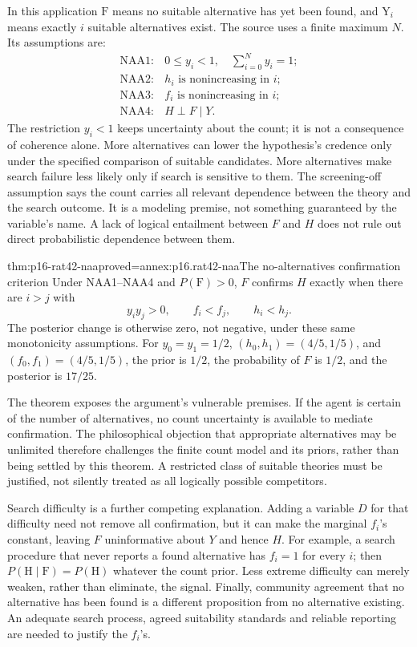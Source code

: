 In this application \(\mathrm F\) means no suitable alternative has yet
been found, and \(\mathrm Y_i\) means exactly \(i\) suitable alternatives
exist. The source uses a finite maximum \(N\). Its assumptions are:
\[
\begin{array}{ll}
 \mathrm{NAA1}:&0\leq y_i<1,\quad \sum_{i=0}^N y_i=1;\\
 \mathrm{NAA2}:&h_i\text{ is nonincreasing in }i;\\
 \mathrm{NAA3}:&f_i\text{ is nonincreasing in }i;\\
 \mathrm{NAA4}:&H\perp F\mid Y.
\end{array}
\]
The restriction \(y_i<1\) keeps uncertainty about the count;
it is not a consequence of coherence alone. More alternatives can
lower the hypothesis's credence only under the specified comparison of
suitable candidates. More alternatives make search failure less likely
only if search is sensitive to them. The screening-off assumption says
the count carries all relevant dependence between the theory and the
search outcome. It is a modeling premise, not something guaranteed by
the variable's name. A lack of logical entailment between \(F\) and
\(H\) does not rule out direct probabilistic dependence between them.

\begin{hbtheorem}{thm:p16-rat42-naa}{proved=annex:p16.rat42-naa}{The no-alternatives confirmation criterion}
Under NAA1--NAA4 and \(P(\mathrm F)>0\), \(F\) confirms \(H\)
exactly when there are \(i>j\) with
\[
           y_i y_j>0,\qquad f_i<f_j,
                          \qquad h_i<h_j.
\]
The posterior change is otherwise zero, not negative, under these
same monotonicity assumptions.
For \(y_0=y_1=1/2\),
\((h_0,h_1)=(4/5,1/5)\), and
\((f_0,f_1)=(4/5,1/5)\), the prior is \(1/2\),
the probability of \(F\) is \(1/2\), and the posterior is \(17/25\).
\end{hbtheorem}

The theorem exposes the argument's vulnerable premises. If the agent is
certain of the number of alternatives, no count uncertainty is available
to mediate confirmation. The philosophical objection that appropriate
alternatives may be unlimited therefore challenges the finite count model
and its priors, rather than being settled by this theorem. A restricted
class of suitable theories must be justified, not silently treated as
all logically possible competitors.

Search difficulty is a further competing explanation. Adding a variable
\(D\) for that difficulty need not remove all confirmation, but it can
make the marginal \(f_i\)'s constant, leaving \(F\) uninformative about
\(Y\) and hence \(H\). For example, a search procedure that never
reports a found alternative has \(f_i=1\) for every \(i\); then
\(P(\mathrm H\mid\mathrm F)=P(\mathrm H)\) whatever the count prior.
Less extreme difficulty can merely weaken, rather than eliminate, the
signal. Finally, community agreement that no alternative has been found
is a different proposition from no alternative existing. An adequate
search process, agreed suitability standards and reliable reporting are
needed to justify the \(f_i\)'s.

